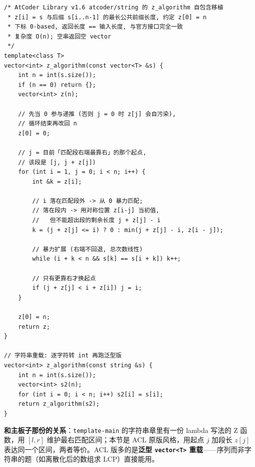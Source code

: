 		\begin{verbatim}
/* AtCoder Library v1.6 atcoder/string 的 z_algorithm 自包含移植
 * z[i] = s 与后缀 s[i..n-1] 的最长公共前缀长度, 约定 z[0] = n
 * 下标 0-based, 返回长度 == 输入长度, 与官方接口完全一致
 * 复杂度 O(n); 空串返回空 vector
 */
template<class T>
vector<int> z_algorithm(const vector<T> &s) {
    int n = int(s.size());
    if (n == 0) return {};
    vector<int> z(n);

    // 先当 0 参与递推 (否则 j = 0 时 z[j] 会自污染),
    // 循环结束再改回 n
    z[0] = 0;

    // j = 目前「匹配段右端最靠右」的那个起点,
    // 该段是 [j, j + z[j])
    for (int i = 1, j = 0; i < n; i++) {
        int &k = z[i];

        // i 落在匹配段外 -> 从 0 暴力匹配;
        // 落在段内 -> 用对称位置 z[i-j] 当初值,
        //   但不能超出段的剩余长度 j + z[j] - i
        k = (j + z[j] <= i) ? 0 : min(j + z[j] - i, z[i - j]);

        // 暴力扩展 (右端不回退, 总次数线性)
        while (i + k < n && s[k] == s[i + k]) k++;

        // 只有更靠右才换起点
        if (j + z[j] < i + z[i]) j = i;
    }

    z[0] = n;
    return z;
}

// 字符串重载: 逐字符转 int 再跑泛型版
vector<int> z_algorithm(const string &s) {
    int n = int(s.size());
    vector<int> s2(n);
    for (int i = 0; i < n; i++) s2[i] = s[i];
    return z_algorithm(s2);
}
		\end{verbatim}

		\textbf{和主板子那份的关系}：\texttt{template-main} 的字符串章里有一份 lambda 写法的 Z 函数，用 $[l, r]$ 维护最右匹配区间；本节是 ACL 原版风格，用起点 $j$ 加段长 $z[j]$ 表达同一个区间，两者等价。ACL 版多的是\textbf{泛型 \texttt{vector<T>} 重载}——序列而非字符串的题（如离散化后的数组求 LCP）直接能用。
